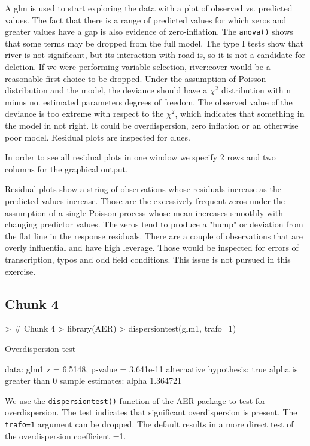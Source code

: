 \documentclass{article}
\begin{document}
A glm is used to start exploring the data with a plot of observed vs. predicted values. The fact that there is a range of predicted values for which zeros and greater values have a gap is also evidence of zero-inflation.
The \verb !anova()! shows that some terms may be dropped from the full model. The type I tests show that river is not significant, but its interaction with road is, so it is not a candidate for deletion. If we were performing variable selection, river:cover would be a reasonable first choice to be dropped. Under the assumption of Poisson distribution and the model, the deviance should have a $\chi^2$ distribution with n minus no. estimated parameters degrees of freedom. The observed value of the deviance is too extreme with respect to the $\chi^2$, which indicates that something in the model in not right. It could be overdispersion, zero inflation or an otherwise poor model. Residual plots are inspected for clues.

In order to see all residual plots in one window we specify 2 rows and two columns for the graphical output.

Residual plots show a string of observations whose residuals increase as the predicted values increase. Those are the excessively frequent zeros under the assumption of a single Poisson process whose mean increases smoothly with changing predictor values. The zeros tend to produce a "hump" or deviation from the flat line in the response residuals. There are a couple of observations that are overly influential and have high leverage. Those would be inspected for errors of transcription, typos and odd field conditions. This issue is not pursued in this exercise.

\subsection{Chunk 4}
\begin{Schunk}
\begin{Sinput}
> # Chunk 4
> library(AER)
> dispersiontest(glm1, trafo=1)
\end{Sinput}
\begin{Soutput}
	Overdispersion test

data:  glm1
z = 6.5148, p-value = 3.641e-11
alternative hypothesis: true alpha is greater than 0
sample estimates:
   alpha 
1.364721 
\end{Soutput}
\end{Schunk}

We use the \verb!dispersiontest()! function of the AER package to test for overdispersion. The test indicates that significant overdispersion is present. The \verb!trafo=1! argument can be dropped. The default results in a more direct test of the overdispersion coefficient =1.
\end{document}
